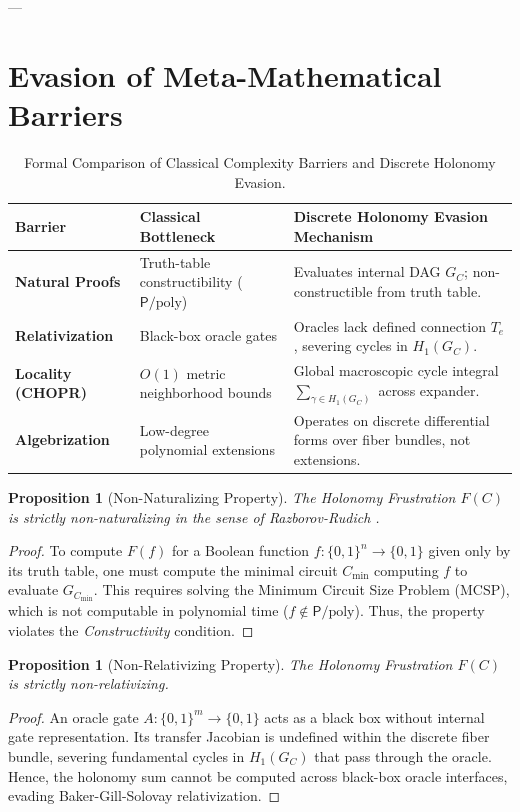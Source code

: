 \documentclass[11pt,a4paper]{article}
\newtheorem{proposition}[theorem]{Proposition}
\renewcommand{\P}{\mathsf{P}}
\newcommand{\poly}{\mathrm{poly}}
\begin{document}
---

\section{Evasion of Meta-Mathematical Barriers}

\begin{table}[h!]
\centering
\small
\begin{tabular}{@{}lll@{}}
\toprule
\textbf{Barrier} & \textbf{Classical Bottleneck} & \textbf{Discrete Holonomy Evasion Mechanism} \\ \midrule
\textbf{Natural Proofs} & Truth-table constructibility ($\P/\poly$) & Evaluates internal DAG $G_C$; non-constructible from truth table. \\
\textbf{Relativization} & Black-box oracle gates & Oracles lack defined connection $T_e$, severing cycles in $H_1(G_C)$. \\
\textbf{Locality (CHOPR)} & $O(1)$ metric neighborhood bounds & Global macroscopic cycle integral $\sum_{\gamma \in H_1(G_C)}$ across expander. \\
\textbf{Algebrization} & Low-degree polynomial extensions & Operates on discrete differential forms over fiber bundles, not extensions. \\ \bottomrule
\end{tabular}
\caption{Formal Comparison of Classical Complexity Barriers and Discrete Holonomy Evasion.}
\label{tab:barriers}
\end{table}

\begin{proposition}[Non-Naturalizing Property]
The Holonomy Frustration $F(C)$ is strictly non-naturalizing in the sense of Razborov-Rudich \cite{rr97}.
\end{proposition}
\begin{proof}
To compute $F(f)$ for a Boolean function $f: \{0,1\}^n \to \{0,1\}$ given only by its truth table, one must compute the minimal circuit $C_{\min}$ computing $f$ to evaluate $G_{C_{\min}}$. This requires solving the Minimum Circuit Size Problem ($\mathrm{MCSP}$), which is not computable in polynomial time ($f \notin \P/\poly$). Thus, the property violates the \emph{Constructivity} condition.
\end{proof}

\begin{proposition}[Non-Relativizing Property]
The Holonomy Frustration $F(C)$ is strictly non-relativizing.
\end{proposition}
\begin{proof}
An oracle gate $A: \{0,1\}^m \to \{0,1\}$ acts as a black box without internal gate representation. Its transfer Jacobian is undefined within the discrete fiber bundle, severing fundamental cycles in $H_1(G_C)$ that pass through the oracle. Hence, the holonomy sum cannot be computed across black-box oracle interfaces, evading Baker-Gill-Solovay relativization.
\end{proof}
\end{document}
